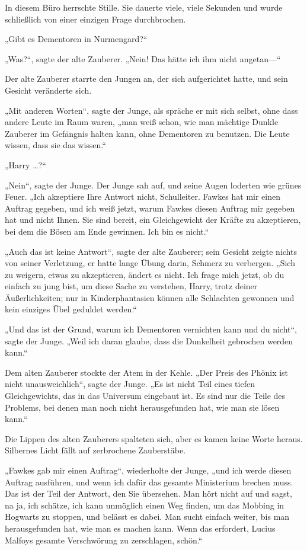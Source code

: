 {In diesem Büro herrschte Stille. Sie dauerte viele, viele Sekunden und wurde schließlich von einer einzigen Frage durchbrochen.

„Gibt es Dementoren in Nurmengard?“

„Was?“, sagte der alte Zauberer. „Nein! Das hätte ich ihm nicht angetan—“

Der alte Zauberer starrte den Jungen an, der sich aufgerichtet hatte, und sein Gesicht veränderte sich.

„Mit anderen Worten“, sagte der Junge, als spräche er mit sich selbst, ohne dass andere Leute im Raum waren, „man weiß schon, wie man mächtige Dunkle Zauberer im Gefängnis halten kann, ohne Dementoren zu benutzen. Die Leute wissen, dass sie das wissen.“

„Harry …?“

„Nein“, sagte der Junge. Der Junge sah auf, und seine Augen loderten wie grünes Feuer. „Ich akzeptiere Ihre Antwort nicht, Schulleiter. Fawkes hat mir einen Auftrag gegeben, und ich weiß jetzt, warum Fawkes diesen Auftrag mir gegeben hat und nicht Ihnen. Sie sind bereit, ein Gleichgewicht der Kräfte zu akzeptieren, bei dem die Bösen am Ende gewinnen. Ich bin es nicht.“

„Auch das ist keine Antwort“, sagte der alte Zauberer; sein Gesicht zeigte nichts von seiner Verletzung, er hatte lange Übung darin, Schmerz zu verbergen. „Sich zu weigern, etwas zu akzeptieren, ändert es nicht. Ich frage mich jetzt, ob du einfach zu jung bist, um diese Sache zu verstehen, Harry, trotz deiner Äußerlichkeiten; nur in Kinderphantasien können alle Schlachten gewonnen und kein einziges Übel geduldet werden.“

„Und das ist der Grund, warum ich Dementoren vernichten kann und du nicht“, sagte der Junge. „Weil ich daran glaube, dass die Dunkelheit gebrochen werden kann.“

Dem alten Zauberer stockte der Atem in der Kehle. „Der Preis des Phönix ist nicht unausweichlich“, sagte der Junge. „Es ist nicht Teil eines tiefen Gleichgewichts, das in das Universum eingebaut ist. Es sind nur die Teile des Problems, bei denen man noch nicht herausgefunden hat, wie man sie lösen kann.“

Die Lippen des alten Zauberers spalteten sich, aber es kamen keine Worte heraus. Silbernes Licht fällt auf zerbrochene Zauberstäbe.

„Fawkes gab mir einen Auftrag“, wiederholte der Junge, „und ich werde diesen Auftrag ausführen, und wenn ich dafür das gesamte Ministerium brechen muss. Das ist der Teil der Antwort, den Sie übersehen. Man hört nicht auf und sagst, na ja, ich schätze, ich kann unmöglich einen Weg finden, um das Mobbing in Hogwarts zu stoppen, und belässt es dabei. Man sucht einfach weiter, bis man herausgefunden hat, wie man es machen kann. Wenn das erfordert, Lucius Malfoys gesamte Verschwörung zu zerschlagen, schön.“

}
